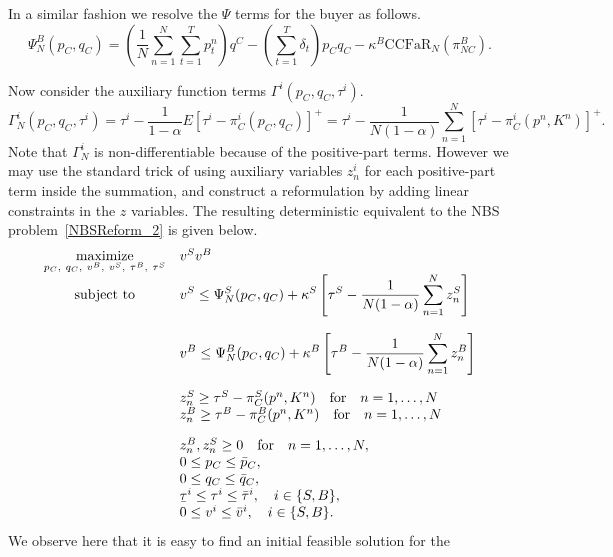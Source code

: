 In a similar fashion we resolve the $\Psi$ terms for the buyer as follows.
\begin{equation}
\Psi_N^B(p_C, q_C) = \displaystyle \left( \frac{1}{N} \sum_{n=1}^N \sum_{t=1}^T
p_t^n \right) q^C - \left( \sum_{t=1}^T \delta_t  \right) p_C q_C  - \kappa^B
\text{CCFaR}_N(\pi_{NC}^B).
\end{equation}

Now consider the auxiliary function terms $\Gamma^i(p_C, q_C, \tau^i)$.
\begin{equation}
\Gamma^i_N(p_C, q_C, \tau^i) = \tau^i - \frac{1}{1 - \alpha} E[\tau^i -
\pi_C^i(p_C, q_C)]^+ = \tau^i - \frac{1}{N(1 - \alpha)}\sum_{n=1}^{N} [\tau^i - \pi_C^i(p^n, K^n)]^+.
\end{equation}
Note that $\Gamma^i_N$ is non-differentiable because of the positive-part terms.
However we may use the standard trick of using auxiliary variables $z^i_n$ for
each positive-part term inside the summation, and construct a reformulation by
adding linear constraints in the $z$ variables. The resulting deterministic
equivalent to the NBS problem~\eqref{NBSReform_2} is given below.
\begin{equation} \label{NBSfinal}
\begin{array}{cl}
\maximize{p_C,\ q_C,\ v^B,\ v^S,\ \tau^B,\ \tau^S} &  v^S v^B  \\
\st & \displaystyle v^S  \leq  \Psi_N^S(p_C, q_C) + \kappa^S \left[ \tau^S - \frac{1}{N(1 - \alpha)} \displaystyle \sum_{n=1}^{N} z_n^S \right] \\[20pt]
& \displaystyle v^B  \leq  \Psi_N^B(p_C, q_C) + \kappa^B \left[ \tau^B - \frac{1}{N(1 - \alpha)} \displaystyle \sum_{n=1}^{N} z_n^B \right] \\[20pt]
& z_n^S  \geq  \tau^S - \pi_C^S(p^n, K^n) \quad \text{for} \quad n = 1 , \dots,  N \\
& z_n^B  \geq  \tau^B - \pi_C^B(p^n, K^n) \quad \text{for} \quad n = 1 , \dots,  N \\ [10pt]
& z_n^B, z_n^S  \geq  0 \quad \text{for} \quad n = 1 , \dots, N, \\
& 0 \leq p_C \leq \bar{p}_C, \\
& 0 \leq q_C \leq \bar{q}_C, \\
& \ubar{\tau}^i \leq \tau^i \leq \bar{\tau}^i, \quad i \in \{S,B\}, \\
& 0 \leq v^i \leq \bar{v}^i, \quad i \in \{S,B\}.
\end{array}
\end{equation}
We observe here that it is easy to find an initial feasible solution for the
